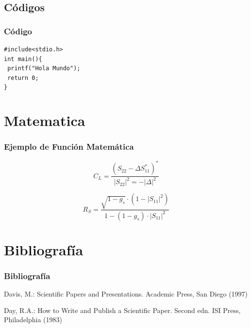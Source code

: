 \documentclass[aspectratio=43]{beamer}%
\begin{document}
\subsection{Códigos}
\begin{frame}[fragile]
\frametitle{\textbf{Código}}
   \vspace{-0.8cm}
\begin{lstlisting}
#include<stdio.h>
int main(){
 printf("Hola Mundo");
 return 0;
}
\end{lstlisting}\vspace{-0.3cm}
\end{frame}


\section{Matematica}
\begin{frame}[fragile]
\frametitle{\textbf{Ejemplo de Función Matemática}}
\justifying
 \begin{displaymath}
C_L=\frac{(S_{22}-\Delta S_{11}^*)^*}{|S_{22}|^2=-|\Delta|^2}
\end{displaymath}
    
\begin{displaymath}
R_S=\frac{\sqrt{1-g_s}\cdot (1-|S_{11}|^2)}{1-(1-g_s)\cdot|S_{11}|^2}
\end{displaymath}

\end{frame}





\section*{Bibliografía}
\begin{frame}[allowframebreaks]
\frametitle{\textbf{Bibliografía}}
\justifying
 \begin{thebibliography}{30}
 
\beamertemplatebookbibitems 
{} Davis, M.: Scientific Papers and Presentations. Academic Press, San Diego (1997)


\beamertemplatearticlebibitems
{} Day, R.A.: How to Write and Publish a Scientific Paper. Second edn. ISI Press, Philadelphia (1983)

\end{thebibliography}  
\end{frame}


\end{document}
